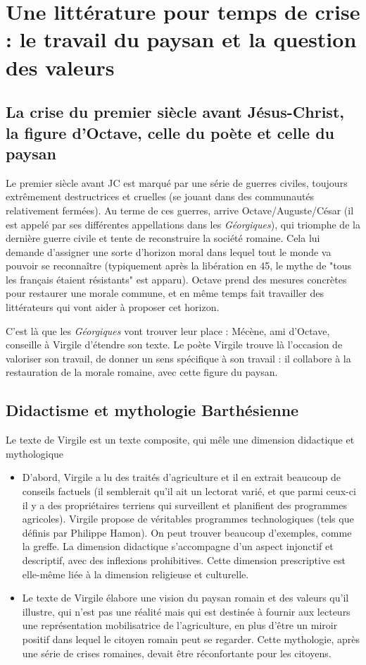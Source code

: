 \documentclass[a4paper,12pt]{book}
\begin{document}
\section{Une littérature pour temps de crise : le travail du paysan et la question des valeurs}
\subsection{La crise du premier siècle avant Jésus-Christ, la figure d'Octave, celle du poète et celle du paysan}
Le premier siècle avant JC est marqué par une série de guerres civiles, toujours extrêmement destructrices et cruelles (se jouant dans des communautés relativement fermées). Au terme de ces guerres, arrive Octave/Auguste/César (il est appelé par ses différentes appellations dans les \textit{Géorgiques}), qui triomphe de la dernière guerre civile et tente de reconstruire la société romaine. Cela lui demande d'assigner une sorte d'horizon moral dans lequel tout le monde va pouvoir se reconnaître (typiquement après la libération en 45, le mythe de "tous les français étaient résistants" est apparu). Octave prend des mesures concrètes pour restaurer une morale commune, et en même temps fait travailler des littérateurs qui vont aider à proposer cet horizon.
\par C'est là que les \textit{Géorgiques} vont trouver leur place : Mécène, ami d'Octave, conseille à Virgile d'étendre son texte. Le poète Virgile trouve là l'occasion de valoriser son travail, de donner un sens spécifique à son travail : il collabore à la restauration de la morale romaine, avec cette figure du paysan.

\subsection{Didactisme et mythologie Barthésienne}
Le texte de Virgile est un texte composite, qui mêle une dimension didactique et mythologique \begin{itemize}
\item D'abord, Virgile a lu des traités d'agriculture et il en extrait beaucoup de conseils factuels (il semblerait qu'il ait un lectorat varié, et que parmi ceux-ci il y a des propriétaires terriens qui surveillent et planifient des programmes agricoles). Virgile propose de véritables programmes technologiques (tels que définis par Philippe Hamon). On peut trouver beaucoup d'exemples, comme la greffe. La dimension didactique s'accompagne d'un aspect injonctif et descriptif, avec des inflexions prohibitives. Cette dimension prescriptive est elle-même liée à la dimension religieuse et culturelle.
\item Le texte de Virgile élabore une vision du paysan romain et des valeurs qu'il illustre, qui n'est pas une réalité mais qui est destinée à fournir aux lecteurs une représentation mobilisatrice de l'agriculture, en plus d'être un miroir positif dans lequel le citoyen romain peut se regarder. Cette mythologie, après une série de crises romaines, devait être réconfortante pour les citoyens.
\end{itemize} 
\end{document}
